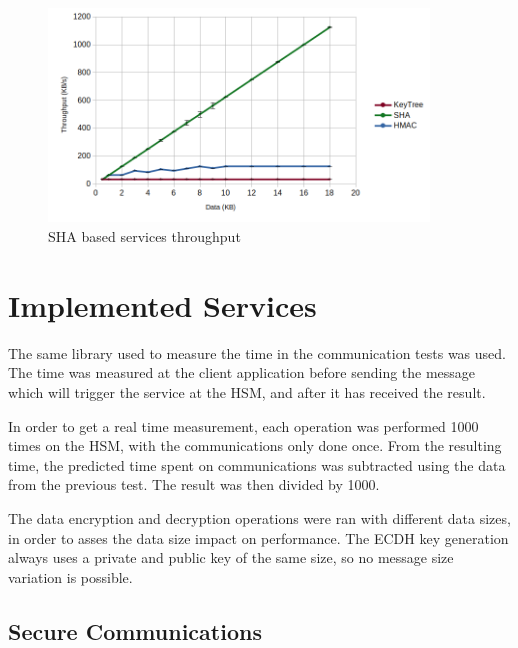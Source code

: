 \begin{figure}[h!]
	\centering
	\includegraphics[width=0.9\textwidth]{./Images/sha-tput.png}
	\caption{SHA based services throughput}
	\label{fig:performance:sha:tput}
\end{figure}

\section{Implemented Services}\label{chap:evaluation:services}

The same library used to measure the time in the communication tests was used.
The time was measured at the client application before sending the message which will trigger the service at the HSM, and after it has received the result.

In order to get a real time measurement, each operation was performed 1000 times on the HSM, with the communications only done once.
From the resulting time, the predicted time spent on communications was subtracted using the data from the previous test. The result was then divided by 1000.

The data encryption and decryption operations were ran with different data sizes, in order to asses the data size impact on performance.
The ECDH key generation always uses a private and public key of the same size, so no message size variation is possible.

\subsection{Secure Communications}\label{chap:evaluation:services:comms}

